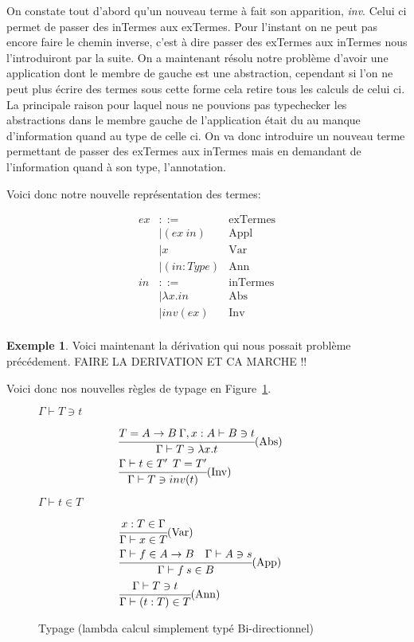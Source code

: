 \documentclass {article}
\theoremstyle{definition}
\newtheorem{example}{Exemple}
\theoremstyle{remark}
\begin{document}
On constate tout d'abord qu'un nouveau terme à fait son apparition, \emph{inv}.
Celui ci permet de passer des inTermes aux exTermes. Pour l'instant on ne peut pas
encore faire le chemin inverse, c'est à dire passer des exTermes aux inTermes nous 
l'introduiront par la suite.
On a maintenant résolu notre problème d'avoir une application dont le membre de gauche
est une abstraction, cependant si l'on ne peut plus écrire des termes sous cette forme
cela retire tous les calculs de celui ci.
La principale raison pour laquel nous ne pouvions pas typechecker les abstractions 
dans le membre gauche de l'application était du au manque d'information quand au type 
de celle ci.
On va donc introduire un nouveau terme permettant de passer des exTermes aux inTermes 
mais en demandant de l'information quand à son type, l'annotation.

Voici donc notre nouvelle représentation des termes:

\begin{align*}
  ex &::= & \mbox{exTermes} \\
  &| (ex\: in) &\mbox{Appl} \\
  &| x &\mbox{Var} \\
  &| (in:Type)&\mbox{Ann} \\
  in &::= & \mbox{inTermes} \\
  &|\lambda x.in &\mbox{Abs} \\ 
  &|inv(ex) &\mbox{Inv} \\
\end{align*}

\begin{example}
Voici maintenant la dérivation qui nous possait problème précédement.
FAIRE LA DERIVATION ET CA MARCHE !!
\end{example}

Voici donc nos nouvelles règles de typage en Figure~\ref{fig:typage-simple-bi-direct}.

\begin{figure}

\center\(\Gamma\vdash T \ni t\)  

\begin{align*}
  &\cfrac{T = A \rightarrow B \: \Gamma, x:A \vdash B \ni t}
  {\Gamma \vdash T \ni \lambda x. t}\mbox{(Abs)}&\: \\
  &\cfrac{\Gamma \vdash t \in T' \:\: T=T'}
  {\Gamma\vdash T \ni inv(t)}\mbox{(Inv)} \\
\end{align*}

\center\(\Gamma\vdash t \in T\) 

\begin{align*}
  &\cfrac{x:T \in \Gamma}
  {\Gamma \vdash x \in T }\mbox{(Var)}&\: \\
  &\cfrac{\Gamma \vdash f \in A\rightarrow B \quad \Gamma\vdash A \ni s }
  {\Gamma\vdash f\:s\in B}\mbox{(App)} \\
  &\cfrac{\Gamma\vdash T \ni t}
    {\Gamma\vdash (t:T) \in T}\mbox{(Ann)} \\
\end{align*}

\caption{Typage (lambda calcul simplement typé Bi-directionnel)}
\label{fig:typage-simple-bi-direct} 
\end{figure}   
\end{document}
